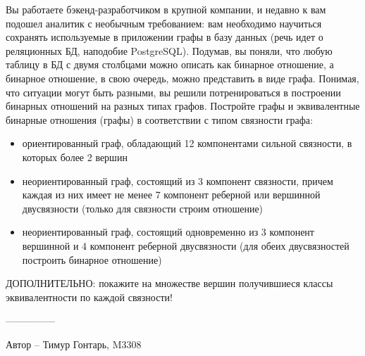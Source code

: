 \question
Вы работаете бэкенд-разработчиком в крупной компании, и недавно к вам подошел аналитик с необычным требованием: вам необходимо научиться сохранять используемые в приложении графы в базу данных (речь идет о реляционных БД, наподобие PostgreSQL). Подумав, вы поняли, что любую таблицу в БД с двумя столбцами можно описать как бинарное отношение, а бинарное отношение, в свою очередь, можно представить в виде графа. Понимая, что ситуации могут быть разными, вы решили потренироваться в построении бинарных отношений на разных типах графов. Постройте графы и эквивалентные бинарные отношения (графы) в соответствии с типом связности графа:

\begin{itemize}
\item ориентированный граф, обладающий 12 компонентами сильной связности, в которых более 2 вершин
\item неориентированный граф, состоящий из 3 компонент связности, причем каждая из них имеет не менее 7 компонент реберной или вершинной двусвязности (только для связности строим отношение)
\item неориентированный граф, состоящий одновременно из 3 компонент вершинной и 4 компонент реберной двусвязности (для обеих двусвязностей построить бинарное отношение)
\end{itemize}
ДОПОЛНИТЕЛЬНО: покажите на множестве вершин получившиеся классы эквивалентности по каждой связности!

---------------

Автор -- Тимур Гонтарь, M3308